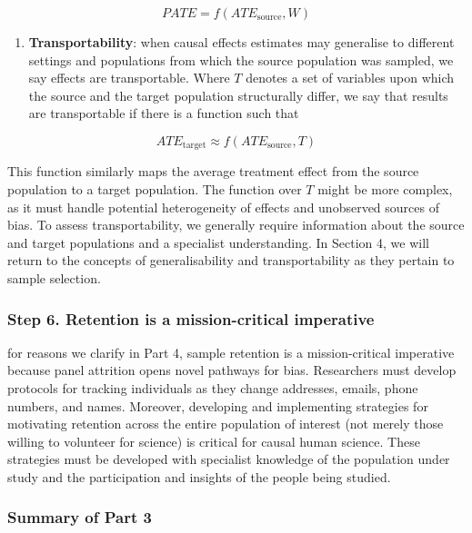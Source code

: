 \documentclass[
  singlecolumn]{article}
\providecommand{\tightlist}{%
  \setlength{\itemsep}{0pt}\setlength{\parskip}{0pt}}\usepackage{longtable,booktabs,array}
\begin{document}
\[PATE =  f(ATE_{\text{source}}, W)\]

\begin{enumerate}
\def\labelenumi{\arabic{enumi}.}
\setcounter{enumi}{3}
\tightlist
\item
  \textbf{Transportability}: when causal effects estimates may
  generalise to different settings and populations from which the source
  population was sampled, we say effects are transportable. Where \(T\)
  denotes a set of variables upon which the source and the target
  population structurally differ, we say that results are transportable
  if there is a function such that
\end{enumerate}

\[ATE_{\text{target}} \approx f(ATE_{\text{source}}, T)\]

This function similarly maps the average treatment effect from the
source population to a target population. The function over \(T\) might
be more complex, as it must handle potential heterogeneity of effects
and unobserved sources of bias. To assess transportability, we generally
require information about the source and target populations and a
specialist understanding. In Section 4, we will return to the concepts
of generalisability and transportability as they pertain to sample
selection.

\hypertarget{step-6.-retention-is-a-mission-critical-imperative}{%
\subsubsection{Step 6. Retention is a mission-critical
imperative}\label{step-6.-retention-is-a-mission-critical-imperative}}

for reasons we clarify in Part 4, sample retention is a mission-critical
imperative because panel attrition opens novel pathways for bias.
Researchers must develop protocols for tracking individuals as they
change addresses, emails, phone numbers, and names. Moreover, developing
and implementing strategies for motivating retention across the entire
population of interest (not merely those willing to volunteer for
science) is critical for causal human science. These strategies must be
developed with specialist knowledge of the population under study and
the participation and insights of the people being studied.

\hypertarget{summary-of-part-3}{%
\subsubsection{Summary of Part 3}\label{summary-of-part-3}}
\end{document}
